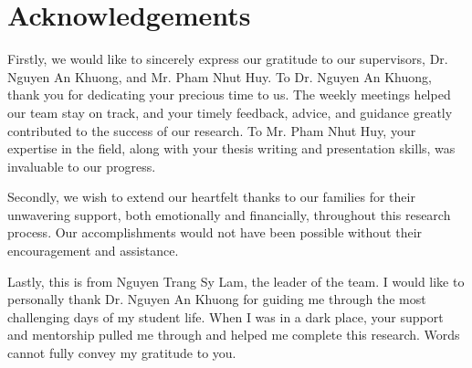 \chapter*{Acknowledgements}

Firstly, we would like to sincerely express our gratitude to our supervisors, Dr. Nguyen An Khuong, and Mr. Pham Nhut Huy. To Dr. Nguyen An Khuong, thank you for dedicating your precious time to us. The weekly meetings helped our team stay on track, and your timely feedback, advice, and guidance greatly contributed to the success of our research. To Mr. Pham Nhut Huy, your expertise in the field, along with your thesis writing and presentation skills, was invaluable to our progress.

Secondly, we wish to extend our heartfelt thanks to our families for their unwavering support, both emotionally and financially, throughout this research process. Our accomplishments would not have been possible without their encouragement and assistance.

Lastly, this is from Nguyen Trang Sy Lam, the leader of the team. I would like to personally thank Dr. Nguyen An Khuong for guiding me through the most challenging days of my student life. When I was in a dark place, your support and mentorship pulled me through and helped me complete this research. Words cannot fully convey my gratitude to you.